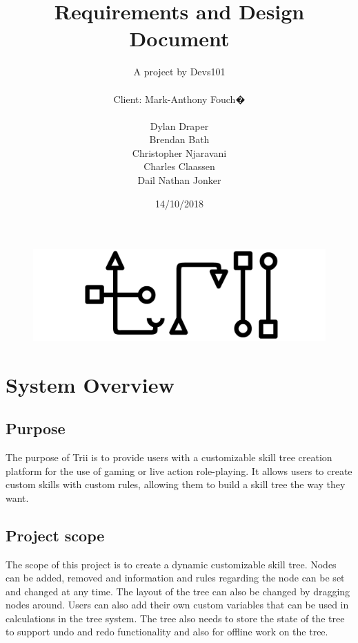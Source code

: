 \documentclass[12pt]{article}
\title{Requirements and Design Document}
\author{A project by Devs101\\ \\
Client: Mark-Anthony Fouch�\\ \\
Dylan Draper\\
Brendan Bath\\
Christopher Njaravani\\
Charles Claassen\\
Dail Nathan Jonker\\
}
\date{14/10/2018}
\begin{document}
\maketitle
\begin{figure}[H]
	\includegraphics[width=\linewidth]{images/logo.jpg}
	\label{fig:logo}
\end{figure}
\newpage
{}

\tableofcontents
\newpage

\section{System Overview}

  \subsection{Purpose}
  The purpose of Trii is to provide users with a customizable skill tree creation platform for the use of gaming or live action role-playing. It allows users to create custom skills with custom rules, allowing them to build a skill tree the way they want.
  
  \subsection{Project scope}
  The scope of this project is to create a dynamic customizable skill tree. Nodes can be added, removed and information and rules regarding the node can be set and changed at any time.\newline 
  The layout of the tree can also be changed by dragging nodes around.\newline 
  Users can also add their own custom variables that can be used in calculations in the tree system.\newline 
  The tree also needs to store the state of the tree to support undo and redo functionality and also for offline work on the tree.
\end{document}

